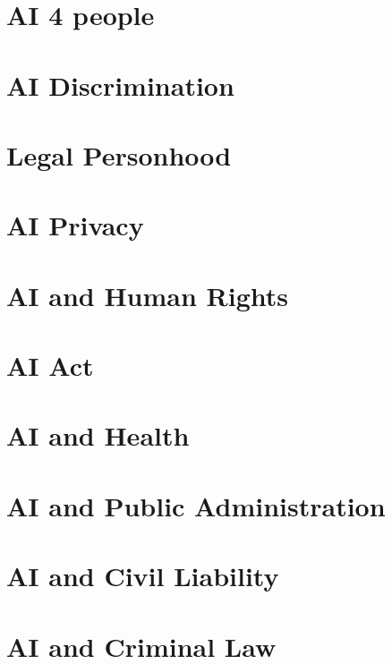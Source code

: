 \documentclass[epsfig,a4paper,11pt,title]{book}
\begin{document}
\frontmatter



\tableofcontents

\mainmatter
\chapter{AI 4 people} 
 \label{sec:AI4People}

\chapter{AI Discrimination}
 \label{sec:AIDiscrimination}

\chapter{Legal Personhood} 
 \label{sec:AIPersonhood}

\chapter{AI Privacy} 
 \label{sec:AIPrivacy}


\chapter{AI and Human Rights}  \label{sec:AIHumanRights}


\chapter{AI Act}  \label{sec:AIAct}


\chapter{AI and Health} 
 \label{sec:AIHealth}

\chapter{AI and Public Administration}  \label{sec:AIPubAdmin}



\chapter{AI and Civil Liability} 
\label{sec:AICivilLiability} 

\chapter{AI and Criminal Law} 
\label{sec:AICriminalLaw} 
\end{document}
